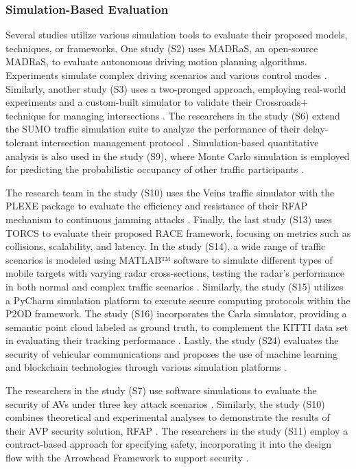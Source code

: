 \documentclass[a4paper,12pt]{article}
\begin{document}
\subsubsection{Simulation-Based Evaluation}
\hspace{5mm} Several studies utilize various simulation tools to evaluate their proposed models, techniques, or frameworks. One study (S2) uses MADRaS, an open-source MADRaS, to evaluate autonomous driving motion planning algorithms. Experiments simulate complex driving scenarios and various control modes \cite{s2}. Similarly, another study (S3) uses a two-pronged approach, employing real-world experiments and a custom-built simulator to validate their Crossroads+ technique for managing intersections \cite{s3}. The researchers in the study (S6) extend the SUMO traffic simulation suite to analyze the performance of their delay-tolerant intersection management protocol \cite{s9}. Simulation-based quantitative analysis is also used in the study (S9), where Monte Carlo simulation is employed for predicting the probabilistic occupancy of other traffic participants \cite{s9}.\par
The research team in the study (S10) uses the Veins traffic simulator with the PLEXE package to evaluate the efficiency and resistance of their RFAP mechanism to continuous jamming attacks \cite{s10}. Finally, the last study (S13) uses TORCS to evaluate their proposed RACE framework, focusing on metrics such as collisions, scalability, and latency. In the study (S14), a wide range of traffic scenarios is modeled using MATLAB™ software to simulate different types of mobile targets with varying radar cross-sections, testing the radar’s performance in both normal and complex traffic scenarios \cite{s13}. Similarly, the study (S15) utilizes a PyCharm simulation platform to execute secure computing protocols within the P2OD framework. The study (S16) incorporates the Carla simulator, providing a semantic point cloud labeled as ground truth, to complement the KITTI data set in evaluating their tracking performance \cite{s15}. Lastly, the study (S24) evaluates the security of vehicular communications and proposes the use of machine learning and blockchain technologies through various simulation platforms \cite{s24}.\par
The researchers in the study (S7) use software simulations to evaluate the security of AVs under three key attack scenarios \cite{s7}. Similarly, the study (S10) combines theoretical and experimental analyses to demonstrate the results of their AVP security solution, RFAP \cite{s10}. The researchers in the study (S11) employ a contract-based approach for specifying safety, incorporating it into the design flow with the Arrowhead Framework to support security \cite{s11}.
\end{document}
